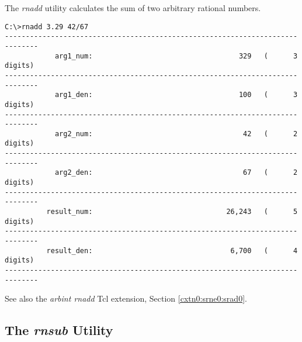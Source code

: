 \begin{dosutilcommandsynopsis}
\end{dosutilcommandsynopsis}

\begin{dosutilcommanddescription}
The \emph{rnadd} utility calculates the sum of two arbitrary
rational numbers.
\end{dosutilcommanddescription}

\begin{dosutilcommandsampleinvocations}
\begin{scriptsize}
\begin{verbatim}
C:\>rnadd 3.29 42/67
------------------------------------------------------------------------------
            arg1_num:                                   329   (      3 digits)
------------------------------------------------------------------------------
            arg1_den:                                   100   (      3 digits)
------------------------------------------------------------------------------
            arg2_num:                                    42   (      2 digits)
------------------------------------------------------------------------------
            arg2_den:                                    67   (      2 digits)
------------------------------------------------------------------------------
          result_num:                                26,243   (      5 digits)
------------------------------------------------------------------------------
          result_den:                                 6,700   (      4 digits)
------------------------------------------------------------------------------
\end{verbatim}
\end{scriptsize}
\end{dosutilcommandsampleinvocations}

\begin{dosutilcommandseealso}
See also the \emph{arbint rnadd} Tcl extension, 
Section \ref{cxtn0:srne0:srad0}.
\end{dosutilcommandseealso}


\subsection{The \emph{rnsub} Utility}
\label{cdcm0:srnu0:srsb0}

